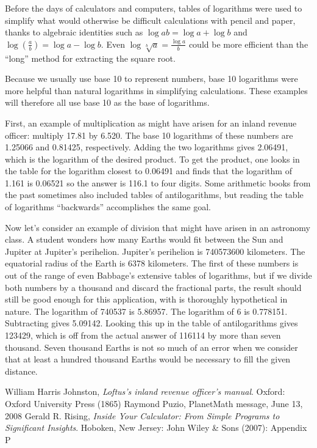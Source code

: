\documentclass[12pt]{article}
\begin{document}
Before the days of calculators and computers, tables of logarithms were used to simplify what would otherwise be difficult calculations with pencil and paper, thanks to algebraic identities such as $\log ab = \log a + \log b$ and $\log ( \frac{a}{b} ) = \log a - \log b$. Even $\log \sqrt[b]{a} = \frac{\log a}{b}$ could be more efficient than the ``long'' method for extracting the square root.

Because we usually use base 10 to represent numbers, base 10 logarithms were more helpful than natural logarithms in simplifying calculations. These examples will therefore all use base 10 as the base of logarithms.

First, an example of multiplication as might have arisen for an inland revenue officer: multiply 17.81 by 6.520. The base 10 logarithms of these numbers are 1.25066 and 0.81425, respectively. Adding the two logarithms gives 2.06491, which is the logarithm of the desired product. To get the product, one looks in the table for the logarithm closest to 0.06491 and finds that the logarithm of 1.161 is 0.06521 so the answer is 116.1 to four digits. Some arithmetic books from the past sometimes also included tables of antilogarithms, but  reading the table of logarithms ``backwards'' accomplishes the same goal.

Now let's consider an example of division that might have arisen in an astronomy class. A student wonders how many Earths would fit between the Sun and Jupiter at Jupiter's perihelion. Jupiter's perihelion is 740573600 kilometers. The equatorial radius of the Earth is 6378 kilometers. The first of these numbers is out of the range of even Babbage's extensive tables of logarithms, but if we divide both numbers by a thousand and discard the fractional parts, the result should still be good enough for this application, with is thoroughly hypothetical in nature. The logarithm of 740537 is 5.86957. The logarithm of 6 is 0.778151. Subtracting gives 5.09142. Looking this up in the table of antilogarithms gives 123429, which is off from the actual answer of 116114 by more than seven thousand. Seven thousand Earths is not so much of an error when we consider that at least a hundred thousand Earths would be necessary to fill the given distance.

\begin{thebibliography}{3}
 William Harris Johnston, {\it Loftus's inland revenue officer's manual}. Oxford: Oxford University Press (1865)
 Raymond Puzio, PlanetMath message, June 13, 2008
 Gerald R. Rising, {\it Inside Your Calculator: From Simple Programs to Significant Insights}. Hoboken, New Jersey: John Wiley \& Sons (2007): Appendix P
\end{thebibliography}
\end{document}
